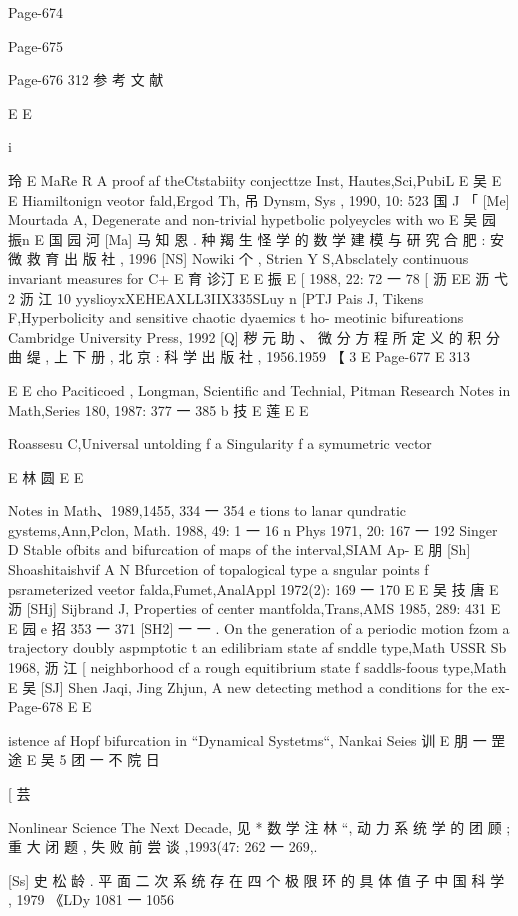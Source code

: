 Page-674

Page-675

Page-676
312 参 考 文 献

E
E

i

玲
E
MaRe R A proof af theCtstabiity conjecttze Inst, Hautes,Sci,PubiL
E 吴 E
E
Hiamiltonign veotor fald,Ergod Th, 吊 Dynsm, Sys , 1990, 10: 523
国 J 「
[Me] Mourtada A, Degenerate and non-trivial hypetbolic polyeycles with wo
E 吴 园 振n
E 国 园
河
[Ma] 马 知 恩 . 种 羯 生 怪 学 的 数 学 建 模 与 研 究 合 肥 : 安 微 救 育 出 版 社 , 1996
[NS] Nowiki 个 , Strien Y S,Absclately continuous invariant measures for C+
E 育 诊汀
E
E 振
E
[
1988, 22: 72 一 78
[ 沥
EE 沥 弋 2 沥 江 10
yyslioyxXEHEAXLL3IIX335SLuy
n
[PTJ Pais J, Tikens F,Hyperbolicity and sensitive chaotic dyaemics t ho-
meotinic bifureations Cambridge University Press, 1992
[Q] 秽 元 助 、 微 分 方 程 所 定 义 的 积 分 曲 缇 , 上 下 册 , 北 京 : 科 学 出 版 社 ,
1956.1959 【
3
E
Page-677
E 313

E
E
cho Paciticoed , Longman, Scientific and Technial, Pitman Research
Notes in Math,Series 180, 1987: 377 一 385
b 技
E 莲 E
E

Roassesu C,Universal untolding f a Singularity f a symumetric vector

E 林 圆
E E

Notes in Math、1989,1455, 334 一 354
e
tions to lanar qundratic gystems,Ann,Pclon, Math. 1988, 49: 1 一 16
n
Phys 1971, 20: 167 一 192
Singer D Stable ofbits and bifurcation of maps of the interval,SIAM Ap-
E 朋
[Sh] Shoashitaishvif A N Bfurcetion of topalogical type a sngular points f
psrameterized veetor falda,Fumet,AnalAppl 1972(2): 169 一 170
E
E 吴 技 唐 E 沥
[SHj] Sijbrand J, Properties of center mantfolda,Trans,AMS 1985, 289: 431
E
E 园 e 招
353 一 371
[SH2] 一 一 . On the generation of a periodic motion fzom a trajectory doubly
aspmptotic t an edilibriam state af snddle type,Math USSR Sb 1968,
沥 江
[
neighborhood cf a rough equitibrium state f saddls-foous type,Math
E 吴
[SJ] Shen Jaqi, Jing Zhjun, A new detecting method a conditions for the ex-
Page-678
E E

istence af Hopf bifurcation in “Dynamical Systetms“, Nankai Seies 训
E 朋 一 罡 途
E 吴 5 团 一 不 院 日

[ 芸

Nonlinear Science The Next Decade, 见 * 数 学 注 林 “, 动 力 系 统 学 的 团
顾 ; 重 大 闭 题 , 失 败 前 尝 谈 ,1993(47: 262 一 269,.

[Ss] 史 松 龄 . 平 面 二 次 系 统 存 在 四 个 极 限 环 的 具 体 值 子 中 国 科 学 , 1979
《LDy 1081 一 1056

